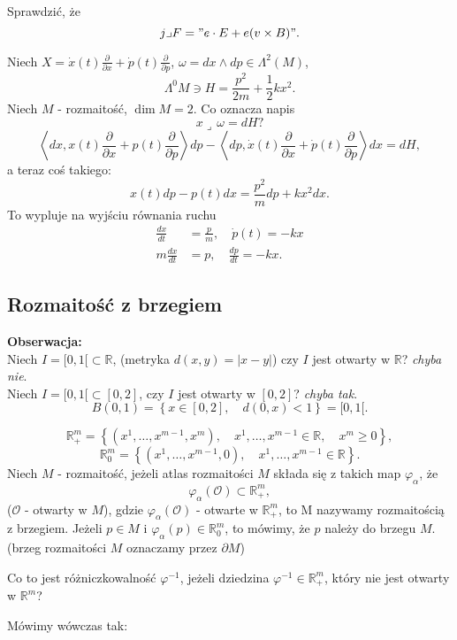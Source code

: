 \documentclass[../main.tex]{subfiles}
\begin{document}
    Sprawdzić, że
    \[
        j \lrcorner F = "e\cdot E + e(v\times B)"
    .\]
\begin{przyklad}
    Niech $X = \dot{x}(t)\frac{\partial }{\partial x} + \dot{p}(t)\frac{\partial }{\partial p} $, $\omega = dx\land dp \in \Lambda^2(M)$,
     \[
         \Lambda^0M \ni H = \frac{p^2}{2m} + \frac{1}{2}kx^2
    .\]
Niech $M$ - rozmaitość, $\dim M = 2$. Co oznacza napis
\[
x\lrcorner\, \omega = dH?
\]
\[
    \left<dx, x(t)\frac{\partial }{\partial x} + p(t)\frac{\partial }{\partial p} \right>dp - \left<dp, \dot{x}(t)\frac{\partial }{\partial x} + \dot{p}(t)\frac{\partial }{\partial p}  \right>dx = dH
,\]
a teraz coś takiego:
\[
    x(t)dp - p(t)dx = \frac{p^2}{m}dp + kx^2dx
.\]
To wypluje na wyjściu równania ruchu
\begin{align*}
    \frac{dx}{dt} &= \frac{p}{m},\quad \dot{p}(t) = -kx\\
    m \frac{dx}{dt} &= p, \quad \frac{dp}{dt} = -kx
.\end{align*}
\end{przyklad}
\subsection{Rozmaitość z brzegiem}
\textbf{Obserwacja:}\\
Niech $I = [0,1[\subset\mathbb{R}$, (metryka $d(x,y) = |x-y|$) czy $I$ jest otwarty w $\mathbb{R}$? \textit{chyba nie}.\\
Niech $I = [0,1[\subset[0,2]$, czy $I$ jest otwarty w $[0,2]$? \textit{chyba tak}.
\[
    B(0,1) = \left\{ x\in [0,2],\quad d(0,x) < 1 \right\} = [0,1[
.\]

\begin{definicja}
    \[
        \mathbb{R}^m_+ = \left\{ (x^1,\ldots,x^{m-1},x^m),\quad x^1,\ldots,x^{m-1}\in\mathbb{R},\quad x^m \ge 0 \right\}
    ,\]
\[
    \mathbb{R}^m_0 = \left\{ (x^1,\ldots,x^{m-1}, 0),\quad x^1,\ldots,x^{m-1}\in\mathbb{R} \right\}
.\]
    Niech $M$ - rozmaitość, jeżeli atlas rozmaitości $M$ składa się z takich map $\varphi_\alpha$, że \[
        \varphi_\alpha(\mathcal{O})\subset\mathbb{R}^m_+
    ,\]
($\mathcal{O}$ - otwarty w $M$), gdzie $\varphi_\alpha(\mathcal{O})$ - otwarte w $\mathbb{R}^m_+$, to M nazywamy rozmaitością z brzegiem. Jeżeli $p\in M$ i $\varphi_\alpha(p)\in \mathbb{R}^m_0$, to mówimy, że $p$ należy do brzegu $M$.\\
    (brzeg rozmaitości $M$ oznaczamy przez $\partial M$)
\end{definicja}
\begin{pytanie}
    Co to jest różniczkowalność $\varphi^{-1}$, jeżeli dziedzina $\varphi^{-1}\in \mathbb{R}^m_+$, który nie jest otwarty w $\mathbb{R}^m$?
\end{pytanie}
Mówimy wówczas tak:
\end{document}
